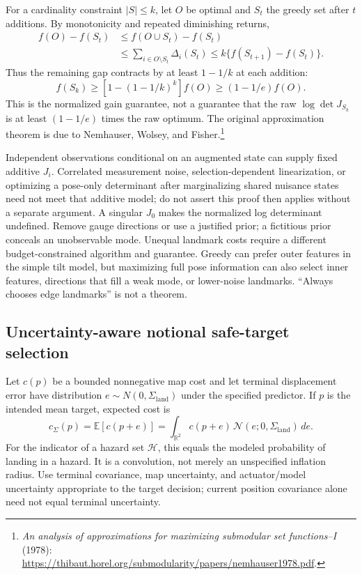 \documentclass[11pt,a4paper]{article}
\numberwithin{equation}{section}
\begin{document}
For a cardinality constraint $|S|\leq k$, let $O$ be optimal and
$S_t$ the greedy set after $t$ additions. By monotonicity and repeated
diminishing returns,
\begin{align}
 f(O)-f(S_t)&\leq f(O\cup S_t)-f(S_t)\\
 &\leq\sum_{i\in O\setminus S_t}\Delta_i(S_t)
 \leq k\{f(S_{t+1})-f(S_t)\}.
\end{align}
Thus the remaining gap contracts by at least $1-1/k$ at each addition:
\begin{equation}
 f(S_k)\geq[1-(1-1/k)^k]f(O)\geq(1-1/e)f(O).
\end{equation}
This is the normalized gain guarantee, not a guarantee that the raw
$\log\det J_{S_k}$ is at least $(1-1/e)$ times the raw optimum.
The original approximation theorem is due to Nemhauser, Wolsey, and
Fisher.\footnote{\emph{An analysis of approximations for maximizing
submodular set functions--I} (1978):
\url{https://thibaut.horel.org/submodularity/papers/nemhauser1978.pdf}.}

Independent observations conditional on an augmented state can supply
fixed additive $J_i$. Correlated measurement noise, selection-dependent
linearization, or optimizing a pose-only determinant after marginalizing
shared nuisance states need not meet that additive model; do not assert
this proof then applies without a separate argument. A singular $J_0$
makes the normalized log determinant undefined. Remove gauge directions
or use a justified prior; a fictitious prior conceals an unobservable
mode. Unequal landmark costs require a different budget-constrained
algorithm and guarantee. Greedy can prefer outer features in the simple
tilt model, but maximizing full pose information can also select inner
features, directions that fill a weak mode, or lower-noise landmarks.
``Always chooses edge landmarks'' is not a theorem.

\subsection{Uncertainty-aware notional safe-target selection}

Let $c(p)$ be a bounded nonnegative map cost and let terminal displacement
error have distribution $e\sim N(0,\Sigma_{\mathrm{land}})$ under the
specified predictor. If $p$ is the intended mean target, expected cost is
\begin{equation}
 c_\Sigma(p)=\mathbb E[c(p+e)]
 =\int_{\mathbb R^2}c(p+e)\,
                      \mathcal N(e;0,\Sigma_{\mathrm{land}})\,de.
 \label{eq:expected-target-cost}
\end{equation}
For the indicator of a hazard set $\mathcal H$, this equals the modeled
probability of landing in a hazard. It is a convolution, not merely
an unspecified inflation radius. Use terminal covariance, map uncertainty,
and actuator/model uncertainty appropriate to the target decision;
current position covariance alone need not equal terminal uncertainty.
\end{document}
